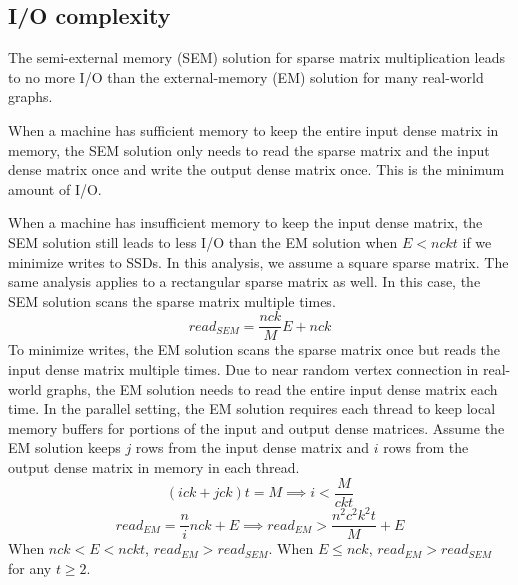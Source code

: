 
\subsection{I/O complexity}
The semi-external memory (SEM) solution for sparse matrix multiplication leads
to no more I/O than the external-memory (EM) solution for many real-world graphs.

When a machine has sufficient memory to keep the entire input dense matrix
in memory, the SEM solution only needs to read the sparse matrix and the input
dense matrix once and write the output dense matrix once. This is
the minimum amount of I/O.

When a machine has insufficient memory to keep the input dense matrix, the SEM
solution still leads to less I/O than the EM solution when $E < n c k t$ if we
minimize writes to SSDs.
In this analysis, we assume a square sparse matrix. The same analysis applies
to a rectangular sparse matrix as well.
In this case, the SEM solution scans the sparse matrix multiple times.
\begin{equation*}
read_{SEM} = \frac{n c k}{M} E + n c k
\end{equation*}
To minimize writes, the EM solution
scans the sparse matrix once but reads the input dense matrix multiple times.
Due to near random vertex connection in real-world graphs, the EM solution needs to
read the entire input dense matrix each time. In the parallel setting,
the EM solution requires each thread to keep local memory buffers for portions
of the input and output dense matrices. Assume the EM solution keeps $j$ rows
from the input dense matrix and $i$ rows from the output dense matrix in memory
in each thread.
\begin{equation*}
(i c k + j c k) t = M \implies i < \frac{M}{c k t}
\end{equation*}
\begin{equation*}
read_{EM} = \frac{n}{i} n c k + E \implies  read_{EM} > \frac{n^2 c^2 k^2 t}{M} + E
\end{equation*}
When $n c k < E < n c k t$, $read_{EM} > read_{SEM}$.
When $E \leq n c k$, $read_{EM} > read_{SEM}$ for any $t \geq 2$.

